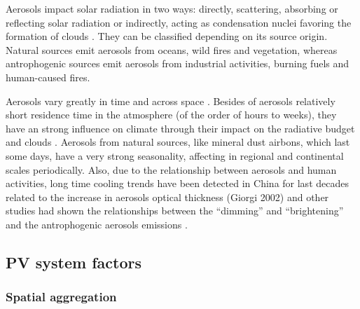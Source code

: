 Aerosols impact solar radiation in two ways: directly, scattering, absorbing or reflecting solar radiation or indirectly, acting as condensation nuclei favoring the formation of clouds \cite*{boucher2015}. They can be classified depending on its source origin. Natural sources emit aerosols from oceans, wild fires and vegetation, whereas antrophogenic sources emit aerosols from industrial activities, burning fuels and human-caused fires.


Aerosols vary greatly in time and across space \cite*{Kaufman2002}. Besides of aerosols relatively short residence time in the atmosphere (of the order of hours to weeks), they have an strong influence on climate through their impact on the radiative budget and clouds \cite*{Nabat2015, Nabat2015a}. Aerosols from natural sources, like mineral dust airbons, which last some days, have a very strong seasonality, affecting in regional and continental scales periodically.  Also, due to the relationship between aerosols and human activities, long time cooling trends have been detected in China for last decades related to the increase in aerosols optical thickness (Giorgi 2002) and other studies had shown the relationships between the ``dimming'' and ``brightening'' and the antrophogenic aerosols emissions \cite*{Wild2005, Wild2012, Wild2009}. 


\subsection{PV system factors}

\subsubsection{Spatial aggregation}

